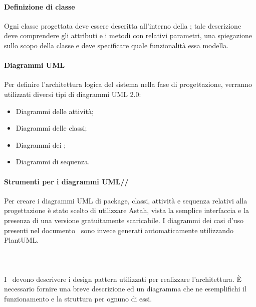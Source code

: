 \documentclass[../NormeDiProgetto.tex]{subfiles}
\begin{document}
			\paragraph{Definizione di classe}  %
				Ogni classe progettata deve essere descritta all’interno della ;
				tale descrizione deve comprendere gli attributi e i metodi con relativi parametri, una spiegazione sullo
				scopo della classe e deve specificare quale funzionalità essa modella.
				
			\paragraph{Diagrammi UML\\}
				Per definire l'architettura logica del sistema nella fase di progettazione,
				verranno utilizzati	diversi tipi di diagrammi UML 2.0:
				\begin{itemize}
					\item Diagrammi delle attività;
					\item Diagrammi delle classi;
					\item Diagrammi dei ;
					\item Diagrammi di sequenza.
				\end{itemize}
				\paragraph{Strumenti per i diagrammi UML//}	
					Per creare i diagrammi UML di package, classi, attività e sequenza relativi alla progettazione
					è stato scelto di utilizzare Astah, vista la semplice interfaccia e la presenza di una versione
					gratuitamente scaricabile.
					I diagrammi dei casi d'uso presenti nel documento \analisideirequisitiv\ sono invece generati
					automaticamente utilizzando PlantUML.
			
			\paragraph{\\}
				I \progettisti\ devono descrivere i design pattern utilizzati per realizzare l'architettura.
				È necessario fornire una breve descrizione ed un diagramma che ne esemplifichi il funzionamento e la struttura per ognuno di essi.
				
\end{document}

